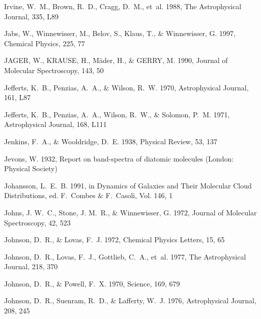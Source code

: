 \documentclass[twocolumn]{aastex631}
\begin{document}
\begin{thebibliography}{}
Irvine, W.~M., Brown, R.~D., Cragg, D.~M., {et~al.} 1988{}, The
  Astrophysical Journal, 335, L89

Jabs, W., Winnewisser, M., Belov, S., Klaus, T., \& Winnewisser, G. 1997,
  Chemical Physics, 225, 77

JAGER, W., KRAUSE, H., M{\"a}der, H., \& GERRY, M. 1990, Journal of Molecular
  Spectroscopy, 143, 50

Jefferts, K.~B., Penzias, A.~A., \& Wilson, R.~W. 1970, Astrophysical Journal,
  161, L87

Jefferts, K.~B., Penzias, A.~A., Wilson, R.~W., \& Solomon, P.~M. 1971,
  Astrophysical Journal, 168, L111

Jenkins, F.~A., \& Wooldridge, D.~E. 1938, Physical Review, 53, 137

Jevons, W. 1932, {Report on band-spectra of diatomic molecules} (London:
  Physical Society)

{Johansson}, L.~E.~B. 1991, in Dynamics of Galaxies and Their Molecular Cloud
  Distributions, ed. F.~{Combes} \& F.~{Casoli}, Vol. 146, 1

Johns, J. W.~C., Stone, J. M.~R., \& Winnewisser, G. 1972, Journal of Molecular
  Spectroscopy, 42, 523

Johnson, D.~R., \& Lovas, F.~J. 1972, Chemical Physics Letters, 15, 65

Johnson, D.~R., Lovas, F.~J., Gottlieb, C.~A., {et~al.} 1977, The Astrophysical
  Journal, 218, 370

Johnson, D.~R., \& Powell, F.~X. 1970, Science, 169, 679

Johnson, D.~R., Suenram, R.~D., \& Lafferty, W.~J. 1976, Astrophysical Journal,
  208, 245


\end{thebibliography}
\end{document}

